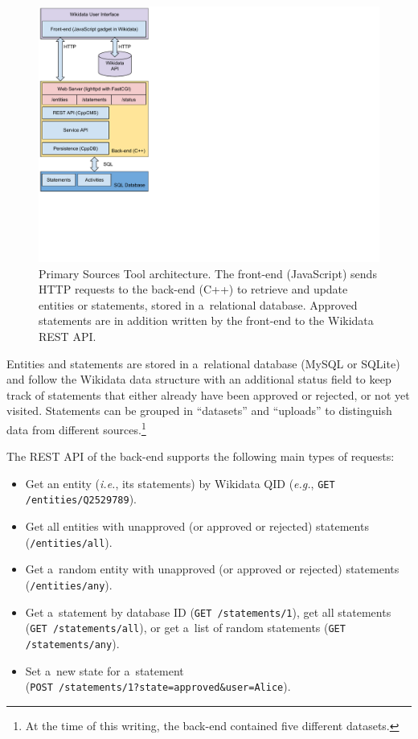 \documentclass{acm_proc_article-sp}
\begin{document}
\begin{figure}[!htbp]
    \centering
    \includegraphics[width=.65\columnwidth]{img/architecture.pdf}
    \caption{Primary Sources Tool architecture. The front-end (JavaScript) sends
      HTTP requests to the back-end (C++) to retrieve and update entities or
      statements, stored in a~relational database. Approved statements are in
      addition written by the front-end to the Wikidata REST API.}    
    \label{fig:architecture}
\end{figure}

Entities and statements are stored in a~relational database (MySQL or SQLite)
and follow the Wikidata data structure with an additional status field
to keep track of statements that either already have been approved or rejected,
or not yet visited.
Statements can be grouped in ``datasets'' and ``uploads'' to
distinguish data from different sources.\footnote{At the time of this writing,
the back-end contained five different datasets.}

The REST API of the back-end supports the following main types of requests:

\begin{itemize}
  \setlength\itemsep{0em}
  \item Get an entity (\emph{i.e.}, its statements) by Wikidata QID
  (\emph{e.g.}, \verb|GET /entities/Q2529789|).
  \item Get all entities with unapproved (or approved or rejected) statements
  (\verb|/entities/all|).
  \item Get a~random entity with unapproved (or approved or rejected) statements
  (\verb|/entities/any|).
  \item Get a~statement by database ID (\verb|GET /statements/1|), get all
    statements (\verb|GET /statements/all|), or get a~list of
  random statements (\verb|GET /statements/any|).
  \item Set a~new state for a~statement \\(\verb|POST /statements/1?state=approved&user=Alice|).
\end{itemize}
\end{document}
